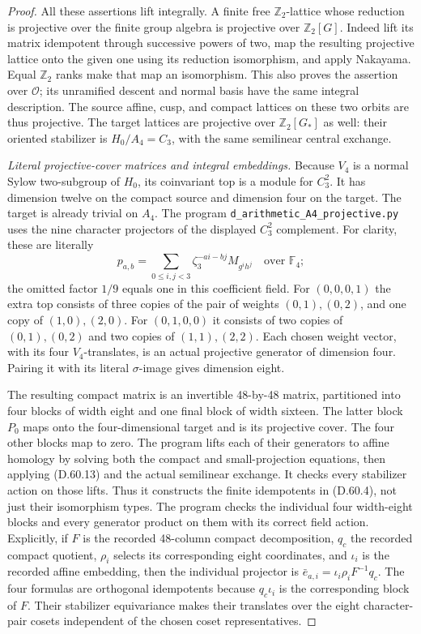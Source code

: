 \begin{proof}
All these assertions lift integrally.
A finite free \(\mathbb Z_2\)-lattice
whose reduction is projective over the
finite group algebra is projective over
\(\mathbb Z_2[G]\). Indeed lift its
matrix idempotent through successive
powers of two, map the resulting
projective lattice onto the given one
using its reduction isomorphism, and
apply Nakayama. Equal \(\mathbb Z_2\)
ranks make that map an isomorphism.
This also proves the assertion over
\(\mathcal O\); its unramified descent
and normal basis have the same integral
description. The source affine, cusp,
and compact lattices on these two
orbits are thus projective.
The target lattices are projective
over \(\mathbb Z_2[G_*]\) as well:
their oriented stabilizer is
\(H_0/A_4=C_3\), with the same
semilinear central exchange.

\emph{Literal projective-cover matrices and integral embeddings.}
Because \(V_4\) is a normal Sylow
two-subgroup of \(H_0\), its coinvariant
top is a module for \(C_3^2\).
It has dimension twelve on the compact
source and dimension four on the target.
The target is already trivial on
\(A_4\). The program
\texttt{d\_arithmetic\_A4\_projective.py}
uses the nine character projectors of
the displayed \(C_3^2\) complement.
For clarity, these are literally
\[
 p_{a,b}=\sum_{0\leq i,j<3}
           \zeta_3^{-ai-bj}M_{g^i h^j}
              \quad\text{over }\mathbb F_4;
 \tag{D.60.13}
\]
the omitted factor \(1/9\) equals one
in this coefficient field.
For \((0,0,0,1)\) the extra top consists
of three copies of the pair of weights
\((0,1),(0,2)\), and one copy of
\((1,0),(2,0)\). For \((0,1,0,0)\)
it consists of two copies of
\((0,1),(0,2)\) and two copies of
\((1,1),(2,2)\).
Each chosen weight vector, with its
four \(V_4\)-translates, is an actual
projective generator of dimension four.
Pairing it with its literal
\(\sigma\)-image gives dimension eight.

The resulting compact matrix is an
invertible 48-by-48 matrix, partitioned
into four blocks of width eight and
one final block of width sixteen.
The latter block \(P_0\) maps onto
the four-dimensional target and is
its projective cover. The four other
blocks map to zero. The program
lifts each of their generators to
affine homology by solving both the
compact and small-projection equations,
then applying (D.60.13) and the actual
semilinear exchange. It checks every
stabilizer action on those lifts.
Thus it constructs the finite
idempotents in (D.60.4), not just
their isomorphism types.
The program
checks the individual four width-eight
blocks and every generator product
on them with its correct field action.
Explicitly, if \(F\) is the recorded
48-column compact decomposition,
\(q_c\) the recorded compact quotient,
\(\rho_i\) selects its corresponding
eight coordinates, and \(\iota_i\)
is the recorded affine embedding,
then the individual projector is
\(\bar e_{a,i}=\iota_i\rho_iF^{-1}q_c\).
The four formulas are orthogonal
idempotents because \(q_c\iota_i\)
is the corresponding block of \(F\).
Their stabilizer equivariance makes
their translates over the eight
character-pair cosets independent
of the chosen coset representatives.


\end{proof}
